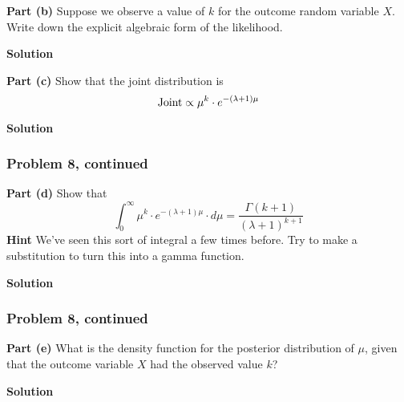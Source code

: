 \documentclass[12pt]{article}
\theoremstyle{definition}
\begin{document}
\vspace{1.5in}
\noindent
{\bf Part (b)} Suppose we observe a value of $k$ for the outcome random variable $X$. Write down the explicit algebraic form of the likelihood.

\bigskip
\noindent
{\bf Solution}


\vspace{1.5in}
\noindent
{\bf Part (c)} Show that the joint distribution is
$$
\hbox{Joint} \propto \mu^k \cdot e^{-(\lambda + 1) \mu}
$$


\bigskip
\noindent
{\bf Solution}


\newpage

\subsubsection*{Problem 8, continued}

\noindent
{\bf Part (d)} Show that
$$
\int_0^\infty \mu^{k} \cdot e^{-(\lambda+1) \mu} \cdot d\mu = \frac{ \Gamma( k + 1 ) }{(\lambda + 1)^{k+1} }
$$
\noindent
{\bf Hint} We've seen this sort of integral a few times before. Try to make a substitution to turn this into a gamma function.

\bigskip
\noindent
{\bf Solution}




\newpage
\subsubsection*{Problem 8, continued}

\noindent
{\bf Part (e)} What is the density function for the posterior distribution of $\mu$, given that the outcome variable $X$ had the observed value $k$?

\bigskip
\noindent
{\bf Solution}
\end{document}
